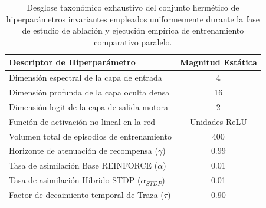 \documentclass[a4paper,12pt,twocolumn]{article}
\begin{document}
\begin{table}[H]
    \centering
    \begin{tabular}{lc}
        \toprule
        \textbf{Descriptor de Hiperparámetro} & \textbf{Magnitud Estática} \\
        \midrule
        Dimensión espectral de la capa de entrada & 4 \\
        Dimensión profunda de la capa oculta densa & 16 \\
        Dimensión logit de la capa de salida motora & 2 \\
        Función de activación no lineal en la red & Unidades ReLU \\
        Volumen total de episodios de entrenamiento & 400 \\
        Horizonte de atenuación de recompensa ($\gamma$) & 0.99 \\
        Tasa de asimilación Base REINFORCE ($\alpha$) & 0.01 \\
        Tasa de asimilación Híbrido STDP ($\alpha_{STDP}$) & 0.01 \\
        Factor de decaimiento temporal de Traza ($\tau$) & 0.90 \\
        \bottomrule
    \end{tabular}
    \caption{Desglose taxonómico exhaustivo del conjunto hermético de hiperparámetros invariantes empleados uniformemente durante la fase de estudio de ablación y ejecución empírica de entrenamiento comparativo paralelo.}
    \label{tab:hyperparams_detailed}
\end{table}
\end{document}
